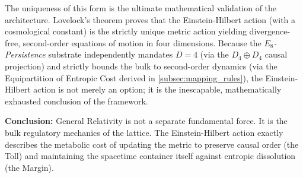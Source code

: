 The uniqueness of this form is the ultimate mathematical validation of the architecture. Lovelock's theorem\cite{lovelock_einstein_1971} proves that the Einstein-Hilbert action (with a cosmological constant) is the strictly unique metric action yielding divergence-free, second-order equations of motion in four dimensions. Because the \textit{$E_8$-Persistence} substrate independently mandates $D=4$ (via the $D_4 \oplus D_4$ causal projection) and strictly bounds the bulk to second-order dynamics (via the Equipartition of Entropic Cost derived in \cref{subsec:mapping_rules}), the Einstein-Hilbert action is not merely an option; it is the inescapable, mathematically exhausted conclusion of the framework.

\textbf{Conclusion:} General Relativity is not a separate fundamental force. It is the bulk regulatory mechanics of the lattice. The Einstein-Hilbert action exactly describes the metabolic cost of updating the metric to preserve causal order (the Toll) and maintaining the spacetime container itself against entropic dissolution (the Margin).